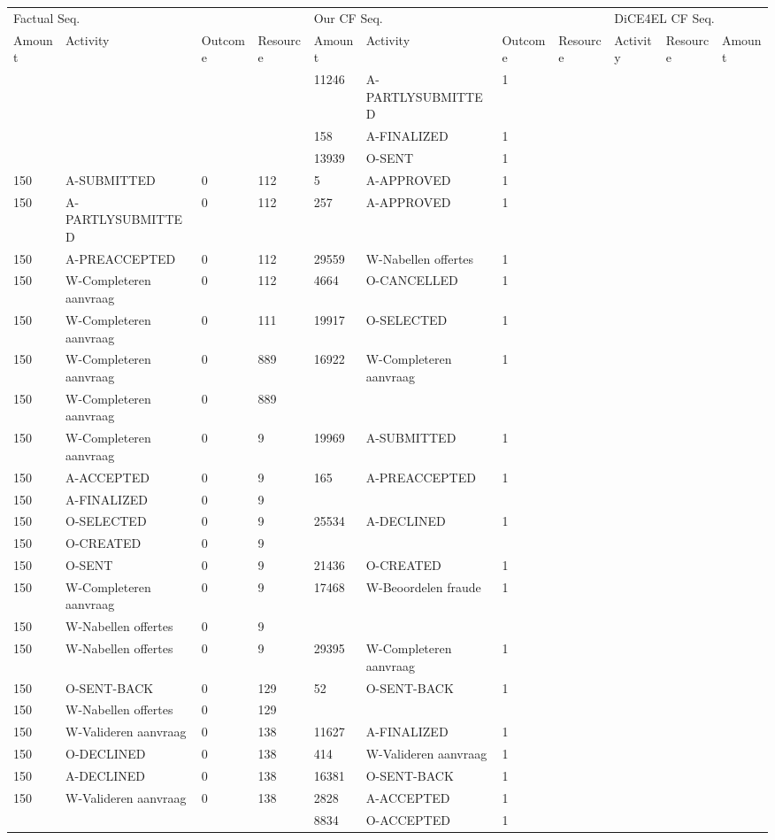\begin{tabular}{lllllllllll}
\toprule
\multicolumn{4}{l}{Factual Seq.} & \multicolumn{4}{l}{Our CF Seq.} & \multicolumn{3}{l}{DiCE4EL CF Seq.} \\
Amount & Activity & Outcome & Resource & Amount & Activity & Outcome & Resource & Activity & Resource & Amount \\
\midrule
 &  &  &  & 11246 & A-PARTLYSUBMITTED & 1 &  &  &  &  \\
 &  &  &  & 158 & A-FINALIZED & 1 &  &  &  &  \\
 &  &  &  & 13939 & O-SENT & 1 &  &  &  &  \\
150 & A-SUBMITTED & 0 & 112 & 5 & A-APPROVED & 1 &  &  &  &  \\
150 & A-PARTLYSUBMITTED & 0 & 112 & 257 & A-APPROVED & 1 &  &  &  &  \\
150 & A-PREACCEPTED & 0 & 112 & 29559 & W-Nabellen offertes & 1 &  &  &  &  \\
150 & W-Completeren aanvraag & 0 & 112 & 4664 & O-CANCELLED & 1 &  &  &  &  \\
150 & W-Completeren aanvraag & 0 & 111 & 19917 & O-SELECTED & 1 &  &  &  &  \\
150 & W-Completeren aanvraag & 0 & 889 & 16922 & W-Completeren aanvraag & 1 &  &  &  &  \\
150 & W-Completeren aanvraag & 0 & 889 &  &  &  &  &  &  &  \\
150 & W-Completeren aanvraag & 0 & 9 & 19969 & A-SUBMITTED & 1 &  &  &  &  \\
150 & A-ACCEPTED & 0 & 9 & 165 & A-PREACCEPTED & 1 &  &  &  &  \\
150 & A-FINALIZED & 0 & 9 &  &  &  &  &  &  &  \\
150 & O-SELECTED & 0 & 9 & 25534 & A-DECLINED & 1 &  &  &  &  \\
150 & O-CREATED & 0 & 9 &  &  &  &  &  &  &  \\
150 & O-SENT & 0 & 9 & 21436 & O-CREATED & 1 &  &  &  &  \\
150 & W-Completeren aanvraag & 0 & 9 & 17468 & W-Beoordelen fraude & 1 &  &  &  &  \\
150 & W-Nabellen offertes & 0 & 9 &  &  &  &  &  &  &  \\
150 & W-Nabellen offertes & 0 & 9 & 29395 & W-Completeren aanvraag & 1 &  &  &  &  \\
150 & O-SENT-BACK & 0 & 129 & 52 & O-SENT-BACK & 1 &  &  &  &  \\
150 & W-Nabellen offertes & 0 & 129 &  &  &  &  &  &  &  \\
150 & W-Valideren aanvraag & 0 & 138 & 11627 & A-FINALIZED & 1 &  &  &  &  \\
150 & O-DECLINED & 0 & 138 & 414 & W-Valideren aanvraag & 1 &  &  &  &  \\
150 & A-DECLINED & 0 & 138 & 16381 & O-SENT-BACK & 1 &  &  &  &  \\
150 & W-Valideren aanvraag & 0 & 138 & 2828 & A-ACCEPTED & 1 &  &  &  &  \\
 &  &  &  & 8834 & O-ACCEPTED & 1 &  &  &  &  \\
\bottomrule
\end{tabular}
